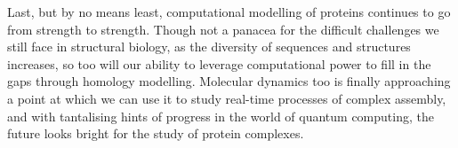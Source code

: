 \documentclass[a4paper,11pt,twoside,openright]{scrbook}
\begin{document}
Last, but by no means least, computational modelling of proteins continues to go
from strength to strength. Though not a panacea for the difficult challenges we
still face in structural biology, as the diversity of sequences and structures
increases, so too will our ability to leverage computational power to fill in
the gaps through homology modelling. Molecular dynamics too is finally
approaching a point at which we can use it to study real-time processes of
complex assembly, and with tantalising hints of progress in the world of quantum
computing, the future looks bright for the study of protein complexes.

\end{document}
